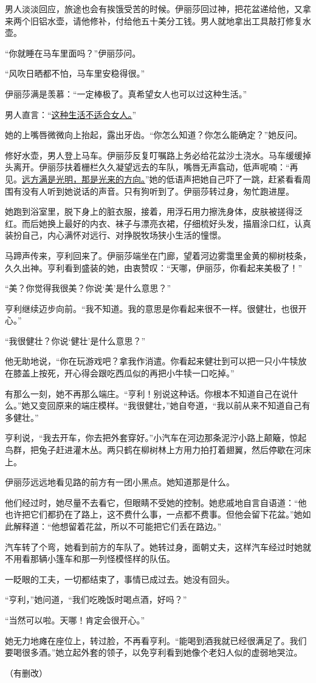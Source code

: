 \documentclass[11pt,a4paper]{ctexart}
\begin{document}
\begin{materialtext}
男人淡淡回应，旅途也会有挨饿受苦的时候。伊丽莎回过神，把花盆递给他，又拿来两个旧铝水壶，请他修补，付给他五十美分工钱。男人就地拿出工具敲打修复水壶。

“你就睡在马车里面吗？”伊丽莎问。

“风吹日晒都不怕，马车里安稳得很。”

伊丽莎满是羡慕：“一定棒极了。真希望女人也可以过这种生活。”

男人直言：“\uline{这种生活不适合女人。}”

她的上嘴唇微微向上抬起，露出牙齿。“你怎么知道？你怎么能确定？”她反问。

修好水壶，男人登上马车。伊丽莎反复叮嘱路上务必给花盆沙土浇水。马车缓缓掉头离开。伊丽莎扶着栅栏久久凝望远去的车队，嘴唇无声翕动，低声呢喃：“再见。\uline{远方满是光明，那是光来的方向。}”她的低语声把她自己吓了一跳，赶紧看看周围有没有人听到她说话的声音。只有狗听到了。伊丽莎转过身，匆忙跑进屋。

她跑到浴室里，脱下身上的脏衣服，接着，用浮石用力擦洗身体，皮肤被搓得泛红。而后她换上最好的内衣、袜子与漂亮衣裙，仔细梳好头发，描眉涂口红，认真装扮自己，内心满怀对远行、对挣脱牧场狭小生活的憧憬。

马蹄声传来，亨利回来了。伊丽莎端坐在门廊，望着河边雾霭里金黄的柳树枝条，久久出神。亨利看到盛装的她，由衷赞叹：“天哪，伊丽莎，你看起来美极了！”

“美？你觉得我很美？你说‘美’是什么意思？”

亨利继续迈步向前。“我不知道。我的意思是你看起来很不一样。很健壮，也很开心。”

“我很健壮？你说‘健壮’是什么意思？”

他无助地说，“你在玩游戏吧？拿我作消遣。你看起来健壮到可以把一只小牛犊放在膝盖上按死，开心得会跟吃西瓜似的再把小牛犊一口吃掉。”

有那么一刻，她不再那么端庄。“亨利！别说这种话。你根本不知道自己在说什么。”她又变回原来的端庄模样。“我很健壮，”她自夸道，“我以前从来不知道自己有多健壮。”

亨利说，“我去开车，你去把外套穿好。”小汽车在河边那条泥泞小路上颠簸，惊起鸟群，把兔子赶进灌木丛。两只鹤在柳树林上方用力拍打着翅翼，然后停歇在河床上。

伊丽莎远远地看见路的前方有一团小黑点。她知道那是什么。

他们经过时，她尽量不去看它，但眼睛不受她的控制。她悲戚地自言自语道：“他也许把它们都扔在了路上，这不费什么事，一点都不费事。但他会留下花盆。”她如此解释道：“他想留着花盆，所以不可能把它们丢在路边。”

汽车转了个弯，她看到前方的车队了。她转过身，面朝丈夫，这样汽车经过时她就不用看那辆小篷车和那一列怪模怪样的队伍。

一眨眼的工夫，一切都结束了，事情已成过去。她没有回头。

“亨利，”她问道，“我们吃晚饭时喝点酒，好吗？”

“当然可以啦。天哪！肯定会很开心。”

她无力地瘫在座位上，转过脸，不再看亨利。“能喝到酒我就已经很满足了。我们要喝很多酒。”她立起外套的领子，以免亨利看到她像个老妇人似的虚弱地哭泣。
\end{materialtext}
\begin{flushright}（有删改）\end{flushright}
\end{document}
